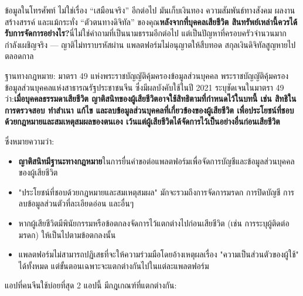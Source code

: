 
ข้อมูลในโทรศัพท์ ไม่ใช่เรื่อง “เสมือนจริง” อีกต่อไป มันเก็บเงินทอง ความสัมพันธ์ทางสังคม ผลงานสร้างสรรค์ และแม้กระทั่ง “ตัวตนทางดิจิทัล” ของคุณ\textbf{หลังจากที่บุคคลเสียชีวิต สินทรัพย์เหล่านี้ควรได้รับการจัดการอย่างไร?}นี่ไม่ใช่คำถามที่เป็นนามธรรมอีกต่อไป แต่เป็นปัญหาที่ครอบครัวจำนวนมากกำลังเผชิญจริง — ญาติไม่ทราบรหัสผ่าน แพลตฟอร์มไม่อนุญาตให้สืบทอด สกุลเงินดิจิทัลสูญหายไปตลอดกาล

\begin{tcbinfo}{ฐานทางกฎหมาย: มาตรา 49 แห่งพระราชบัญญัติคุ้มครองข้อมูลส่วนบุคคล}
พระราชบัญญัติคุ้มครองข้อมูลส่วนบุคคลแห่งสาธารณรัฐประชาชนจีน ซึ่งมีผลบังคับใช้ในปี 2021 ระบุชัดเจนในมาตรา 49 ว่า:\textbf{เมื่อบุคคลธรรมดาเสียชีวิต ญาติสนิทของผู้เสียชีวิตอาจใช้สิทธิตามที่กำหนดไว้ในบทนี้ เช่น สิทธิในการตรวจสอบ ทำสำเนา แก้ไข และลบข้อมูลส่วนบุคคลที่เกี่ยวข้องของผู้เสียชีวิต เพื่อประโยชน์ที่ชอบด้วยกฎหมายและสมเหตุสมผลของตนเอง เว้นแต่ผู้เสียชีวิตได้จัดการไว้เป็นอย่างอื่นก่อนเสียชีวิต}

ซึ่งหมายความว่า:

\begin{itemize}
  \item \textbf{ญาติสนิทมีฐานะทางกฎหมาย}ในการยื่นคำขอต่อแพลตฟอร์มเพื่อจัดการบัญชีและข้อมูลส่วนบุคคลของผู้เสียชีวิต
  \item "ประโยชน์ที่ชอบด้วยกฎหมายและสมเหตุสมผล" มักจะรวมถึงการจัดการมรดก การปิดบัญชี การลบข้อมูลส่วนตัวที่ละเอียดอ่อน และอื่นๆ
  \item หากผู้เสียชีวิตมีพินัยกรรมหรือข้อตกลงจัดการไว้แตกต่างไปก่อนเสียชีวิต (เช่น การระบุผู้ติดต่อมรดก) ให้เป็นไปตามข้อตกลงนั้น
  \item แพลตฟอร์มไม่สามารถปฏิเสธที่จะให้ความร่วมมือโดยอ้างเหตุผลเรื่อง "ความเป็นส่วนตัวของผู้ใช้" ได้ทั้งหมด แต่ขั้นตอนเฉพาะจะแตกต่างกันไปในแต่ละแพลตฟอร์ม
\end{itemize}

\end{tcbinfo}


แอปที่คนจีนใช้บ่อยที่สุด 2 แอปนี้ มีกฎเกณฑ์ที่แตกต่างกัน:

